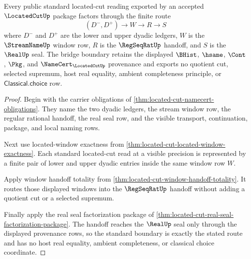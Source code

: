 \begin{theorem}
\label{thm:located-cut-standard-bridge-boundary}
Every public standard located-cut reading exported by an accepted $\LocatedCutUp$ package factors through the finite route
$$
(D^{-},D^{+}) \longrightarrow W \longrightarrow R \longrightarrow S
$$
where $D^{-}$ and $D^{+}$ are the lower and upper dyadic ledgers, $W$ is the $\StreamNameUp$ window row, $R$ is the $\RegSeqRatUp$ handoff, and $S$ is the $\RealUp$ seal. The bridge boundary retains the displayed $\BHist$, $\hsame$, $\Cont$, $\Pkg$, and $\NameCert_{\LocatedCutUp}$ provenance and exports no quotient cut, selected supremum, host real equality, ambient completeness principle, or $\mathsf{Classical.choice}$ row.
\end{theorem}
\begin{proof}
Begin with the carrier obligations of \autoref{thm:located-cut-namecert-obligations}. They name the two dyadic ledgers, the stream window row, the regular rational handoff, the real seal row, and the visible transport, continuation, package, and local naming rows.

Next use located-window exactness from \autoref{thm:located-cut-located-window-exactness}. Each standard located-cut read at a visible precision is represented by a finite pair of lower and upper dyadic entries inside the same window row $W$.

Apply window handoff totality from \autoref{thm:located-cut-window-handoff-totality}. It routes those displayed windows into the $\RegSeqRatUp$ handoff without adding a quotient cut or a selected supremum.

Finally apply the real seal factorization package of \autoref{thm:located-cut-real-seal-factorization-package}. The handoff reaches the $\RealUp$ seal only through the displayed provenance rows, so the standard boundary is exactly the stated route and has no host real equality, ambient completeness, or classical choice coordinate.
\end{proof}


